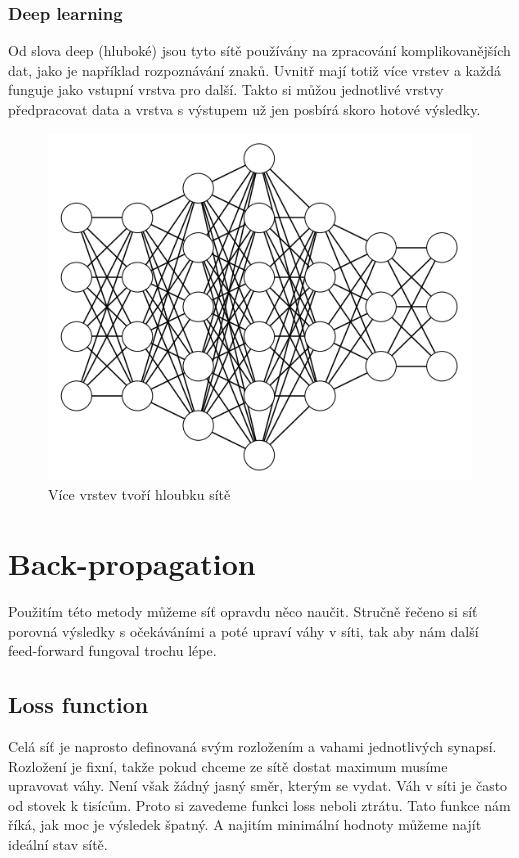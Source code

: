 \documentclass[12pt,a4paper]{report}
\begin{document}
		\subsection{Deep learning}
		Od slova deep (hluboké) jsou tyto sítě používány na zpracování komplikovanějších dat, jako je například rozpoznávání znaků. Uvnitř mají totiž více vrstev a každá funguje jako vstupní vrstva pro další. Takto si můžou jednotlivé vrstvy předpracovat data a vrstva s výstupem už jen posbírá skoro hotové výsledky.
		\begin{figure}[h]
			\centering
			\includegraphics[width=15cm]{images/nn4-4-5-6-4-3-3}
			\caption{Více vrstev tvoří hloubku sítě}
		\end{figure}
\chapter{Back-propagation}
Použitím této metody můžeme síť opravdu něco naučit. Stručně řečeno si síť porovná výsledky s očekáváními a poté upraví váhy v síti, tak aby nám další feed-forward fungoval trochu lépe.
	\section{Loss function}
	Celá síť je naprosto definovaná svým rozložením a vahami jednotlivých synapsí. Rozložení je fixní, takže pokud chceme ze sítě dostat maximum musíme upravovat váhy. Není však žádný jasný směr, kterým se vydat. Váh v síti je často od stovek k tisícům. Proto si zavedeme funkci loss neboli ztrátu. Tato funkce nám říká, jak moc je výsledek špatný. A najitím minimální hodnoty můžeme najít ideální stav sítě.
\end{document}
